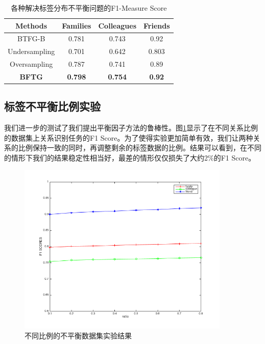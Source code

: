 \begin{table}
\center
\caption{各种解决标签分布不平衡问题的F1-Measure Score}
\label{tb-imbalance-methods}
\begin{tabular}{|c|c|c|c|}
\hline
Methods & Families & Colleagues & Friends \\ \hline \hline
BTFG-B &0.781 & 0.743 & 0.92 \\ 
Undersampling & 0.701 & 0.642 &0.803 \\ 
Oversampling & 0.787 & 0.741 & 0.89\\ \hline
\textbf{BFTG} & \textbf{0.798} &  \textbf{0.754} & \textbf{0.92} \\ \hline
\end{tabular}
\end{table}


\subsection{标签不平衡比例实验}
我们进一步的测试了我们提出平衡因子方法的鲁棒性。图\ref{fig-imbalance-ratio}显示了在不同关系比例的数据集上关系识别任务的F1 Score。为了使得实验更加简单有效，我们让两种关系的比例保持一致的同时，再调整剩余的标签数据的比例。结果可以看到，在不同的情形下我们的结果稳定性相当好，最差的情形仅仅损失了大约2\%的F1 Score。



\begin{figure}[ht]
    \centering
    \includegraphics[scale=1, width=0.9\textwidth]{figure/RatioPer.png}
    \caption{不同比例的不平衡数据集实验结果}
    \label{fig-imbalance-ratio}
\end{figure}


















































